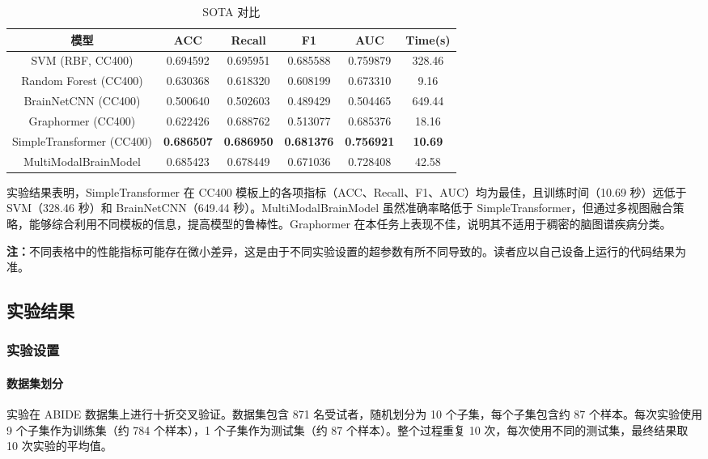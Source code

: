 \documentclass[12pt,a4paper]{article}
\begin{document}
\begin{table}[H]
\centering
\caption{SOTA 对比}
\label{tab:sota}
\begin{tabular}{cccccc}
\toprule
模型 & ACC & Recall & F1 & AUC & Time(s) \\
\midrule
SVM (RBF, CC400) & 0.694592 & 0.695951 & 0.685588 & 0.759879 & 328.46 \\
Random Forest (CC400) & 0.630368 & 0.618320 & 0.608199 & 0.673310 & 9.16 \\
BrainNetCNN (CC400) & 0.500640 & 0.502603 & 0.489429 & 0.504465 & 649.44 \\
Graphormer (CC400) & 0.622426 & 0.688762 & 0.513077 & 0.685376 & 18.16 \\
SimpleTransformer (CC400) & \textbf{0.686507} & \textbf{0.686950} & \textbf{0.681376} & \textbf{0.756921} & \textbf{10.69} \\
MultiModalBrainModel & 0.685423 & 0.678449 & 0.671036 & 0.728408 & 42.58 \\
\bottomrule
\end{tabular}
\end{table}

实验结果表明，SimpleTransformer 在 CC400 模板上的各项指标（ACC、Recall、F1、AUC）均为最佳，且训练时间（10.69 秒）远低于 SVM（328.46 秒）和 BrainNetCNN（649.44 秒）。MultiModalBrainModel 虽然准确率略低于 SimpleTransformer，但通过多视图融合策略，能够综合利用不同模板的信息，提高模型的鲁棒性。Graphormer 在本任务上表现不佳，说明其不适用于稠密的脑图谱疾病分类。

\textbf{注：}不同表格中的性能指标可能存在微小差异，这是由于不同实验设置的超参数有所不同导致的。读者应以自己设备上运行的代码结果为准。

\subsection{实验结果}

\subsubsection{实验设置}

\paragraph{数据集划分}
实验在 ABIDE 数据集上进行十折交叉验证。数据集包含 871 名受试者，随机划分为 10 个子集，每个子集包含约 87 个样本。每次实验使用 9 个子集作为训练集（约 784 个样本），1 个子集作为测试集（约 87 个样本）。整个过程重复 10 次，每次使用不同的测试集，最终结果取 10 次实验的平均值。
\end{document}
